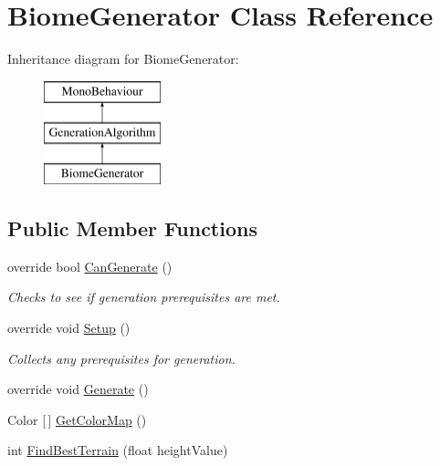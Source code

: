 \hypertarget{class_biome_generator}{}\section{Biome\+Generator Class Reference}
\label{class_biome_generator}
Inheritance diagram for Biome\+Generator\+:\begin{figure}[H]
\begin{center}
\leavevmode
\includegraphics[height=3.000000cm]{class_biome_generator}
\end{center}
\end{figure}
\subsection*{Public Member Functions}
\begin{DoxyCompactItemize}
\item 
override bool \mbox{\hyperlink{class_biome_generator_abe3d21283eef52d4c3ae631178ab69fc}{Can\+Generate}} ()
\begin{DoxyCompactList}\small\item\em Checks to see if generation prerequisites are met. \end{DoxyCompactList}\item 
override void \mbox{\hyperlink{class_biome_generator_aa1df38909c58ff7112ebfd285e65f6c0}{Setup}} ()
\begin{DoxyCompactList}\small\item\em Collects any prerequisites for generation. \end{DoxyCompactList}\item 
override void \mbox{\hyperlink{class_biome_generator_ac8ac31b6e0276662994f0cd143457fdb}{Generate}} ()
\item 
Color \mbox{[}$\,$\mbox{]} \mbox{\hyperlink{class_biome_generator_ad1c3b877b0dde5621250e5ca3c78446a}{Get\+Color\+Map}} ()
\item 
int \mbox{\hyperlink{class_biome_generator_aa4113331412728f686a99dfebf78a42e}{Find\+Best\+Terrain}} (float height\+Value)
\end{DoxyCompactItemize}
